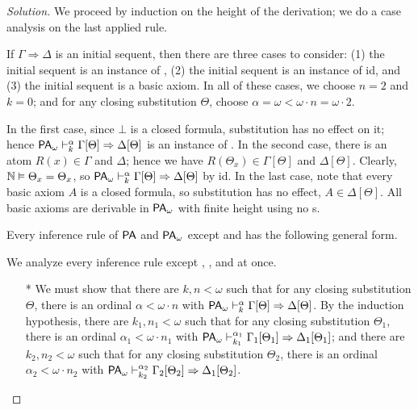 \documentclass[a4paper]{article}
\begin{document}
\begin{proof}[Solution]
  We proceed by induction on the height of the derivation; we do a case analysis on the last applied rule.

  If $\Gamma \Rightarrow \Delta$ is an initial sequent, then there are three cases to consider: (1) the initial sequent is an instance of \rLBot, (2) the initial sequent is an instance of id, and (3) the initial sequent is a basic axiom.
  In all of these cases, we choose $n = 2$ and $k = 0$; and for any closing substitution $\Theta$, choose $\alpha = \omega < \omega \cdot n = \omega \cdot 2$.

  In the first case, since $\bot$ is a closed formula, substitution has no effect on it; hence $\PAod{\alpha}{k} \Gamma[\Theta] \Rightarrow \Delta[\Theta]$ is an instance of \rLBot.
  In the second case, there is an atom $R(x) \in \Gamma$ and $\Delta$; hence we have $R(\Theta_x) \in \Gamma[\Theta]$ and $\Delta[\Theta]$.
  Clearly, $\NN \vDash \Theta_x = \Theta_x$, so $\PAod{\alpha}{k} \Gamma[\Theta] \Rightarrow \Delta[\Theta]$ by id.
  In the last case, note that every basic axiom $A$ is a closed formula, so substitution has no effect, \ie $A \in \Delta[\Theta]$.
  All basic axioms are derivable in $\PAo$ with finite height using no \rCut{}s.

  Every inference rule of $\PA$ and $\PAo$ except \rLo{} and \rRo{} has the following general form.
  \begin{mathpar}
  \end{mathpar}
  We analyze every inference rule except \rLEx, \rRAll, and \rCut{} at once.
  \begin{itemize}
  \item[*] We must show that there are $k, n < \omega$ such that for any closing substitution $\Theta$, there is an ordinal $\alpha < \omega \cdot n$ with $\PAod{\alpha}{k} \Gamma[\Theta] \Rightarrow \Delta[\Theta]$.
    By the induction hypothesis, there are $k_1,n_1 < \omega$ such that for any closing substitution $\Theta_1$, there is an ordinal $\alpha_1 < \omega \cdot n_1$ with $\PAod{\alpha_1}{k_1} \Gamma_1[\Theta_1] \Rightarrow \Delta_1[\Theta_1]$; and there are $k_2,n_2 < \omega$ such that for any closing substitution $\Theta_2$, there is an ordinal $\alpha_2 < \omega \cdot n_2$ with $\PAod{\alpha_2}{k_2} \Gamma_2[\Theta_2] \Rightarrow \Delta_1[\Theta_2]$.


\end{itemize}
\end{proof}
\end{document}
